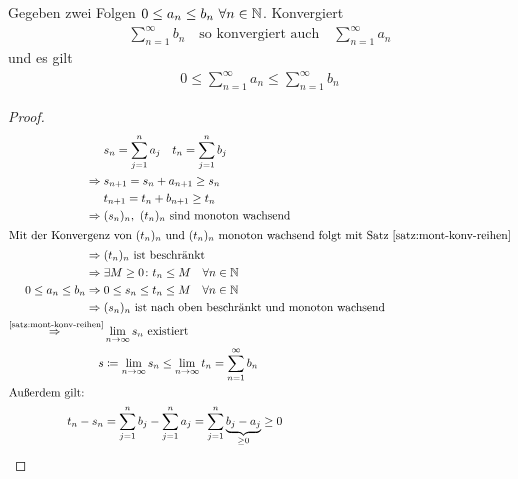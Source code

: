 \begin{satz} %
    \label{satz:majoranten-kriterium}
    Gegeben zwei Folgen $0\leq a_n \leq b_n~\forall n\in\mathbb{N}$. Konvergiert
    \begin{align*}
        \sum_{n=1}^{\infty} b_n\quad\text{so konvergiert auch}\quad\sum_{n=1}^{\infty} a_n
    \end{align*}
    und es gilt
    \begin{align*}
        0\leq \sum_{n=1}^{\infty} a_n \leq \sum_{n=1}^{\infty} b_n
    \end{align*}
    \begin{proof}
        \begin{align*}
            &s_n = \sum_{j=1}^{n} a_j\quad t_n = \sum_{j=1}^{n} b_j\\
            \Rightarrow{} &s_{n+1} = s_n + a_{n+1} \geq s_n\\
            &t_{n+1} = t_n + b_{n+1} \geq t_n\\
            \Rightarrow{} &(s_n)_n,~(t_n)_n\text{ sind monoton wachsend}\\
            \intertext{Mit der Konvergenz von $(t_n)_n$ und $(t_n)_n$ monoton wachsend folgt mit Satz~\ref{satz:mont-konv-reihen}}
            \Rightarrow{} &(t_n)_n\text{ ist beschränkt}\\
            \Rightarrow{} &\exists M\geq 0\colon t_n \leq M\quad\forall n\in\mathbb{N}\\
            0\leq a_n \leq b_n \Rightarrow{} &0\leq s_n \leq t_n \leq M \quad\forall n\in\mathbb{N}\\
            \Rightarrow{} &(s_n)_n\text{ ist nach oben beschränkt und monoton wachsend}\\
            \overset{\text{\ref{satz:mont-konv-reihen}}}{\Rightarrow{}} &\lim_{n\rightarrow{}\infty} s_n\text{ existiert }\\
            \quad s &\coloneqq \lim_{n\rightarrow{}\infty} s_n \leq \lim_{n\rightarrow{}\infty} t_n = \sum_{n=1}^{\infty} b_n\qedhere\\
            \intertext{Außerdem gilt:}
            t_n - s_n &= \sum_{j=1}^{n} b_j - \sum_{j=1}^{n} a_j = \sum_{j=1}^{n} \underbrace{b_j-a_j}_{\geq 0} \geq 0
        \end{align*}
    \end{proof}
\end{satz}

